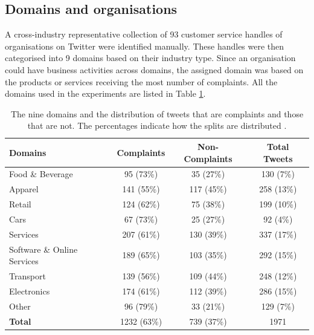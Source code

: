 \subsection{Domains and organisations}
A cross-industry representative collection of 93 customer service handles of organisations on Twitter were identified manually. These handles were then categorised into 9 domains based on their industry type. Since an organisation could have business activities across domains, the assigned domain was based on the products or services receiving the most number of complaints. All the domains used in the experiments are listed in Table \ref{tab: domains}.
\begin{table}[ht]
    \captionsetup{font=small}
    \centering
    \begin{tabularx}{\textwidth}{|X|c|c|c|}
        \hline
        \rowcolor[gray]{0.7}
        \textbf{Domains}            & \textbf{Complaints} & \textbf{Non-Complaints} & \textbf{Total Tweets} \\
        \hline
        Food \& Beverage            & 95 \small{(73\%)}   & 35 \small{(27\%)}       & 130 \small{(7\%)}     \\
        \rowcolor[gray]{0.9}
        Apparel                     & 141 \small{(55\%)}  & 117 \small{(45\%)}      & 258 \small{(13\%)}    \\
        Retail                      & 124 \small{(62\%)}  & 75 \small{(38\%)}       & 199 \small{(10\%)}    \\
        \rowcolor[gray]{0.9}
        Cars                        & 67 \small{(73\%)}   & 25 \small{(27\%)}       & 92 \small{(4\%)}      \\
        Services                    & 207 \small{(61\%)}  & 130 \small{(39\%)}      & 337 \small{(17\%)}    \\
        \rowcolor[gray]{0.9}
        Software \& Online Services & 189 \small{(65\%)}  & 103 \small{(35\%)}      & 292 \small{(15\%)}    \\
        Transport                   & 139 \small{(56\%)}  & 109 \small{(44\%)}      & 248 \small{(12\%)}    \\
        \rowcolor[gray]{0.9}
        Electronics                 & 174 \small{(61\%)}  & 112 \small{(39\%)}      & 286 \small{(15\%)}    \\
        Other                       & 96 \small{(79\%)}   & 33 \small{(21\%)}       & 129 \small{(7\%)}     \\
        \hline
        \rowcolor[gray]{0.9}
        \textbf{Total}              & 1232 \small{(63\%)} & 739 \small{(37\%)}      & 1971                  \\
        \hline
    \end{tabularx}
    \caption{The nine domains and the distribution of tweets that are complaints and those that are not. The percentages indicate how the splits are distributed \cite{preotiuc-pietro_automatically_2019}.}
    \label{tab: domains}
\end{table}

